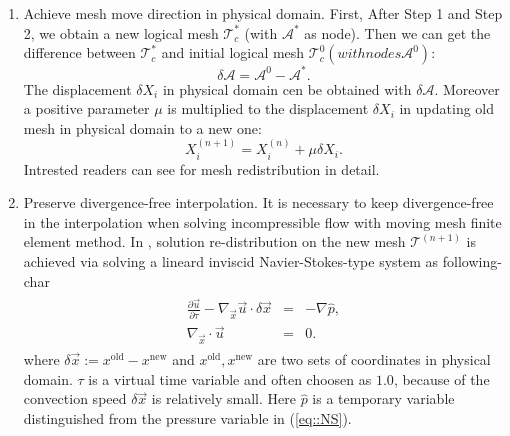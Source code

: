 \documentclass{eajam}
\begin{document}
\begin{enumerate}[step 1]
     \item Achieve mesh move direction in physical domain.
       First, After Step 1 and Step 2, we obtain a new logical mesh
       $\mathcal{T}_c^*$ (with $\mathcal{A}^*$ as node). Then we can get
       the difference between $\mathcal{T}_c^*$ and initial logical mesh
       $\mathcal{T}_c^0(with nodes \mathcal{A}^0)$:
       \begin{equation}
         \delta \mathcal{A} = \mathcal{A}^0 - \mathcal{A}^*.
       \end{equation}
       The displacement $\delta X_i$ in physical domain cen be obtained
       with $\delta \mathcal{A}$. Moreover a positive parameter $\mu$ is multiplied to the 
       displacement $\delta X_i$ in updating old mesh in physical domain
       to a new one: 
       \begin{equation}
         X_i^{(n + 1)} = X_i^{(n)} + \mu \delta X_i.
       \end{equation}
       Intrested readers can see \cite{li2002moving} for mesh
       redistribution in detail.

     \item Preserve divergence-free interpolation.
       It is necessary to keep divergence-free in the interpolation
       when solving incompressible flow with moving mesh finite element
       method. In \cite{di2005moving}, solution re-distribution on the new 
       mesh $\mathcal{T}^{(n + 1)}$ is achieved via solving a lineard inviscid 
       Navier-Stokes-type system as following-char
       \begin{eqnarray}
         \begin{aligned}
           \frac{\partial \vec{u}}{\partial \tau} - \nabla_{\vec{x}}\vec{u}
           \cdot \delta \vec{x} & = & - \nabla \hat{p}, \\
           \nabla_{\vec{x}}\cdot \vec{u} & = & 0.
         \end{aligned}
         \label{eq::continous_update}
       \end{eqnarray} 
       where $\delta \vec{x} := x^{\text{old}} - x^{\text{new}}$ and 
       $x^{\text{old}}, x^{\text{new}}$ are two sets of coordinates in
       physical domain. $\tau$ is a virtual time variable and often
       choosen as $1.0$, because of the convection speed $\delta \vec{x}$
       is relatively small. Here $\hat{p}$ is a temporary variable
       distinguished from the pressure variable in (\ref{eq::NS}). 


\end{enumerate}
\end{document}
